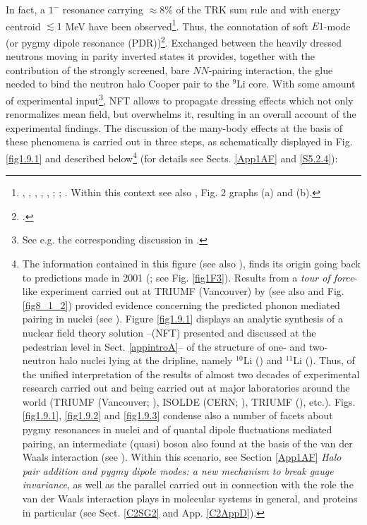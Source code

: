  In fact, a $1^-$ resonance carrying $\approx 8\%$ of the TRK sum rule and with energy centroid  $\lesssim 1$ MeV have been observed\footnote{\label{f119C2} \cite{Zinser:97}, \cite{Nakamura:06}, \cite{Shimoura:95}, \cite{Ieki:93}, \cite{Sackett:93},  \cite{Kobayashi:89}; \cite{Kanungo:15}; \cite{Aumann:19}. Within this context see also \cite{Barranco:01}, Fig. 2 graphs (a) and (b).}. Thus, the connotation of soft $E1$-mode (or pygmy dipole  resonance (PDR))\footnote{\cite{Broglia:19}.}. Exchanged between the heavily dressed neutrons moving in  parity inverted states it provides, together with the contribution of the strongly screened, bare $NN$-pairing interaction, the glue needed to bind the neutron halo Cooper pair to the $^9$Li core. With some amount of experimental input\footnote{See e.g. the corresponding discussion in \cite{Barranco:17}.}, NFT allows to propagate dressing effects which not only renormalizes mean field, but overwhelms it, resulting in an overall account of the experimental findings.
The discussion of the many-body effects at the basis of these phenomena is carried out   in three steps, as schematically displayed in Fig. \ref{fig1.9.1} and described below\footnote{The information contained in this figure (see also \cite{Broglia:19b}), finds its origin going back to predictions made in 2001 (\cite{Barranco:01}; see Fig. \ref{fig1F3}). Results from a \textit{tour of force}-like experiment carried out at TRIUMF (Vancouver) by \cite{Tanihata:08} (see also \cite{Tanihata:13} and Fig. \ref{fig8_1_2})  provided evidence concerning the predicted phonon mediated pairing in nuclei (see \cite{Potel:10}). Figure \ref{fig1.9.1} displays an analytic synthesis of a nuclear field theory solution --(NFT) presented and discussed at the pedestrian level in Sect. \ref{appintroA}-- of the structure of one- and two- neutron halo nuclei lying at the dripline, namely $^{10}$Li (\cite{Barranco:20}) and $^{11}$Li (\cite{Barranco:01}). Thus, of the unified interpretation of the results of almost two decades of experimental research carried out and being carried out at major laboratories around the world (TRIUMF (Vancouver; \cite{Tanihata:08}), ISOLDE (CERN; \cite{Jeppesen:06}), TRIUMF (\cite{Cavallaro:17}), etc.). Figs. \ref{fig1.9.1}, \ref{fig1.9.2} and \ref{fig1.9.3} condense also a number of facets about pygmy resonances in nuclei  and of quantal dipole fluctuations mediated pairing, an intermediate (quasi) boson also found at the basis of the van der Waals interaction (see \cite{Broglia:19}). Within this scenario, see  Section  \ref{App1AF} \textit{Halo pair addition  and pygmy dipole modes: a new mechanism to break gauge invariance}, as well as the parallel carried out in connection with the role the van der Waals interaction plays in molecular systems in general, and proteins in particular (see Sect. \ref{C2SG2} and App. \ref{C2AppD}).
} (for details see Sects. \ref{App1AF} and \ref{S5.2.4}):


